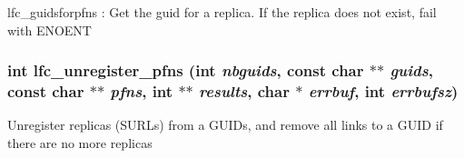 lfc\_\-guidsforpfns : Get the guid for a replica. If the replica does not exist, fail with ENOENT 
\subsubsection{\setlength{\rightskip}{0pt plus 5cm}int lfc\_\-unregister\_\-pfns (int {\em nbguids}, const char $\ast$$\ast$ {\em guids}, const char $\ast$$\ast$ {\em pfns}, int $\ast$$\ast$ {\em results}, char $\ast$ {\em errbuf}, int {\em errbufsz})}\label{group__lowlevel_g9ea58977487f9be50e91ba9857bc9510}


Unregister replicas (SURLs) from a GUIDs, and remove all links to a GUID if there are no more replicas 